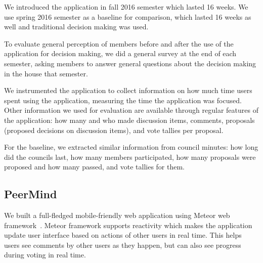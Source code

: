 \documentclass[format=acmsmall, review=true, screen=true, anonymous=true]{acmart}
\begin{document}
We introduced the application in fall 2016 semester which lasted 16 weeks. We use spring 2016 semester as
a baseline for comparison, which lasted 16 weeks as well and traditional decision making was used.

To evaluate general perception of members before and after the use of the application for decision making,
we did a general survey at the end of each semester, asking members to answer general questions about the
decision making in the house that semester.

We instrumented the application to collect information on how much time users spent using the application,
measuring the time the application was focused. Other information we used for evaluation are available
through regular features of the application: how many and who made discussion items, comments, proposals
(proposed decisions on discussion items), and vote tallies per proposal.

For the baseline, we extracted similar information from council minutes: how long did the councils last,
how many members participated, how many proposals were proposed and how many passed, and vote tallies for them.


\subsection{PeerMind}
\label{sec:peermind}

We built a full-fledged mobile-friendly web application using Meteor web framework~\cite{meteor}.
Meteor framework supports reactivity which makes the application update user interface based on actions
of other users in real time. This helps users see comments by other users as they happen, but can also see
progress during voting in real time.
\end{document}
